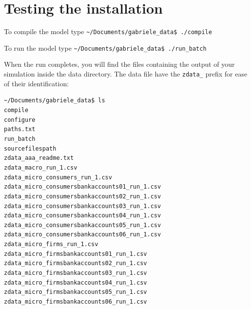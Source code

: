 \documentclass{book}
\begin{document}
\section{Testing the installation}

To compile the model type
\vskip2mm
\noindent\verb+~/Documents/gabriele_data$ +\color{red}\verb|./compile| \color{black}
\vskip2mm

To run the model type
\vskip2mm
\noindent\verb+~/Documents/gabriele_data$ +\color{red}\verb|./run_batch| \color{black}
\vskip2mm

When the run completes, you will find the files containing the output of your simulation inside the data directory.
The data file have the \verb+zdata_+ prefix for ease of their identification: 

\vskip2mm
\noindent\verb+~/Documents/gabriele_data$ +\color{red}\verb|ls| \\ \color{green}
\verb+compile+ \\
\verb+configure+ \\ \color{blue}
\verb+paths.txt+ \\ \color{green}
\verb+run_batch+ \\ \color{blue}
\verb+sourcefilespath+ \\
\verb+zdata_aaa_readme.txt+ \\
\verb+zdata_macro_run_1.csv+ \\
\verb+zdata_micro_consumers_run_1.csv+ \\
\verb+zdata_micro_consumersbankaccounts01_run_1.csv+ \\
\verb+zdata_micro_consumersbankaccounts02_run_1.csv+ \\
\verb+zdata_micro_consumersbankaccounts03_run_1.csv+ \\
\verb+zdata_micro_consumersbankaccounts04_run_1.csv+ \\
\verb+zdata_micro_consumersbankaccounts05_run_1.csv+ \\
\verb+zdata_micro_consumersbankaccounts06_run_1.csv+ \\
\verb+zdata_micro_firms_run_1.csv+ \\
\verb+zdata_micro_firmsbankaccounts01_run_1.csv+ \\
\verb+zdata_micro_firmsbankaccounts02_run_1.csv+ \\
\verb+zdata_micro_firmsbankaccounts03_run_1.csv+ \\
\verb+zdata_micro_firmsbankaccounts04_run_1.csv+ \\
\verb+zdata_micro_firmsbankaccounts05_run_1.csv+ \\
\verb+zdata_micro_firmsbankaccounts06_run_1.csv+ \\
\vskip2mm
\color{black}
\end{document}
